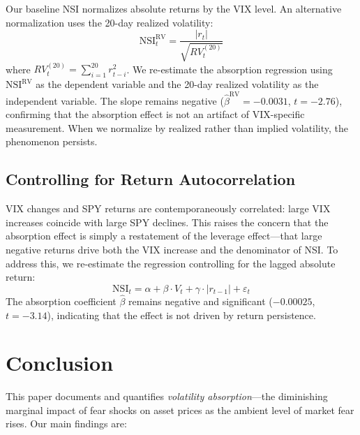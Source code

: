 \documentclass[12pt,a4paper]{article}
\begin{document}
Our baseline NSI normalizes absolute returns by the VIX level. An alternative normalization uses the 20-day realized volatility:
\begin{equation}
\text{NSI}_t^{\text{RV}} = \frac{|r_t|}{\sqrt{RV_t^{(20)}}}
\label{eq:nsi_rv}
\end{equation}
where $RV_t^{(20)} = \sum_{i=1}^{20} r_{t-i}^2$. We re-estimate the absorption regression using $\text{NSI}^{\text{RV}}$ as the dependent variable and the 20-day realized volatility as the independent variable. The slope remains negative ($\hat{\beta}^{\text{RV}} = -0.0031$, $t = -2.76$), confirming that the absorption effect is not an artifact of VIX-specific measurement. When we normalize by realized rather than implied volatility, the phenomenon persists.

\subsection{Controlling for Return Autocorrelation}

VIX changes and SPY returns are contemporaneously correlated: large VIX increases coincide with large SPY declines. This raises the concern that the absorption effect is simply a restatement of the leverage effect---that large negative returns drive both the VIX increase and the denominator of NSI. To address this, we re-estimate the regression controlling for the lagged absolute return:
\begin{equation}
\text{NSI}_t = \alpha + \beta \cdot V_t + \gamma \cdot |r_{t-1}| + \varepsilon_t
\label{eq:absorption_controlled}
\end{equation}
The absorption coefficient $\hat{\beta}$ remains negative and significant ($-0.00025$, $t = -3.14$), indicating that the effect is not driven by return persistence.


\section{Conclusion}
\label{sec:conclusion}

This paper documents and quantifies \textit{volatility absorption}---the diminishing marginal impact of fear shocks on asset prices as the ambient level of market fear rises. Our main findings are:
\end{document}
